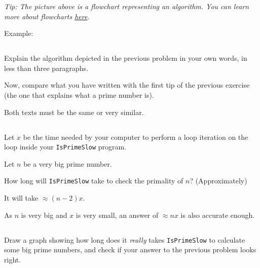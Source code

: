 \documentclass[a4paper, 12pt]{article}
\begin{document}
\textsl{Tip: The picture above is a flowchart representing an algorithm. You
can learn more about flowcharts
\href{http://en.wikipedia.org/wiki/Flowchart}{here}.}

Example:



\subsection{}

Explain the algorithm depicted in the previous problem in your own words, in
less than three paragraphs.

Now, compare what you have written with the first tip of the previous exercise
(the one that explains what a prime number is).

\begin{solution}
Both texts must be the same or very similar.
\end{solution}

\subsection{}

Let $x$ be the time needed by your computer to perform a loop iteration on the
loop inside your \texttt{IsPrimeSlow} program.

Let $n$ be a very big prime number.

How long will \texttt{IsPrimeSlow} take to check the primality of $n$?
(Approximately)

\begin{solution}
It will take $\approx(n-2)x$.

As $n$ is very big and $x$ is very small, an answer of $\approx nx$ is also
accurate enough.
\end{solution}

\subsection{}

Draw a graph showing how long does it \emph{really} takes \texttt{IsPrimeSlow}
to calculate some big prime numbers, and check if your answer to the previous
problem looks right.
\end{document}
